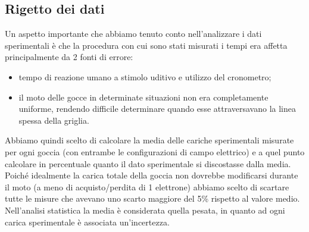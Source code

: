     
    
\subsection{Rigetto dei dati}
Un aspetto importante che abbiamo tenuto conto nell'analizzare i dati sperimentali è che la procedura con cui sono stati misurati i tempi era affetta principalmente da 2 fonti di errore:\begin{itemize}
    \item tempo di reazione umano a stimolo uditivo e utilizzo del cronometro;
    \item il moto delle gocce in determinate situazioni non era completamente uniforme, rendendo difficile determinare quando esse attraversavano la linea spessa della griglia.
\end{itemize}
Abbiamo quindi scelto di calcolare la media delle cariche sperimentali misurate per ogni goccia (con entrambe le configurazioni di campo elettrico) e a quel punto calcolare in percentuale quanto il dato sperimentale si discostasse dalla media.
Poiché idealmente la carica totale della goccia non dovrebbe modificarsi durante il moto (a meno di acquisto/perdita di 1 elettrone) abbiamo scelto di scartare tutte le misure che avevano uno scarto maggiore del 5\% rispetto al valore medio.\\
Nell'analisi statistica la media è considerata quella pesata, in quanto ad ogni carica sperimentale è associata un'incertezza.\\